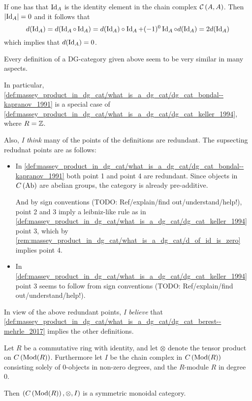 \begin{remark}
    \label{rem:massey_product_in_dg_cat/what_is_a_dg_cat/d_of_id_is_zero}
    If one has that \( \operatorname{Id}_A \) is the identity element in the chain complex \( {\mathcal{C}}\left( A, A \right) \). Then \( \lvert \operatorname{Id}_A \rvert = 0 \) and it follows that
    \[
        d(\operatorname{Id}_A) = d(\operatorname{Id}_A \circ \operatorname{Id}_A) = d(\operatorname{Id}_A) \circ \operatorname{Id}_A + (-1)^0 \operatorname{Id}_A \circ d(\operatorname{Id}_A) = 2d(\operatorname{Id}_A)
    \]
    which implies that \( d(\operatorname{Id}_A) = 0 \).
\end{remark}

\begin{remark}
    Every definition of a DG-category given above seem to be very similar in many aspects.

    In particular, \autoref{def:massey_product_in_dg_cat/what_is_a_dg_cat/dg_cat_bondal--kapranov_1991} is a special case of \autoref{def:massey_product_in_dg_cat/what_is_a_dg_cat/dg_cat_keller_1994}, where \( R = {\mathbb{Z}} \).

    Also, \emph{I think} many of the points of the definitions are redundant. The supsecting redudnat points are as follows:
    \begin{itemize}
        \item {
            In \autoref{def:massey_product_in_dg_cat/what_is_a_dg_cat/dg_cat_bondal--kapranov_1991} both point 1 and point 4 are redundant. Since objects in \( C \left( \operatorname{Ab} \right) \) are abelian groups, the category is already pre-additive.
            
            And by sign conventions (TODO: Ref/explain/find out/understand/help!), point 2 and 3 imply a leibniz-like rule as in \autoref{def:massey_product_in_dg_cat/what_is_a_dg_cat/dg_cat_keller_1994} point 3, which by \autoref{rem:massey_product_in_dg_cat/what_is_a_dg_cat/d_of_id_is_zero} implies point 4.
        }
        \item {
            In \autoref{def:massey_product_in_dg_cat/what_is_a_dg_cat/dg_cat_keller_1994} point 3 seems to follow from sign conventions (TODO: Ref/explain/find out/understand/help!).
        }
    \end{itemize}

    In view of the above redundant points, \emph{I believe} that \autoref{def:massey_product_in_dg_cat/what_is_a_dg_cat/dg_cat_berest--mehrle_2017} implies the other definitions.
\end{remark}

\begin{fact}[nlab]
    Let \( R \) be a commutative ring with identity, and let \( \otimes \) denote the tensor product on \( C \left( \operatorname{Mod}(R) \right) \). Furthermore let \( I \) be the chain complex in \( C \left( \operatorname{Mod}(R) \right) \) consisting solely of \( 0 \)-objects in non-zero degrees, and the \( R \)-module \( R \) in degree 0. 

    Then \( \left( C \left( \operatorname{Mod}(R) \right), \otimes, I \right) \) is a symmetric monoidal category.
\end{fact}

